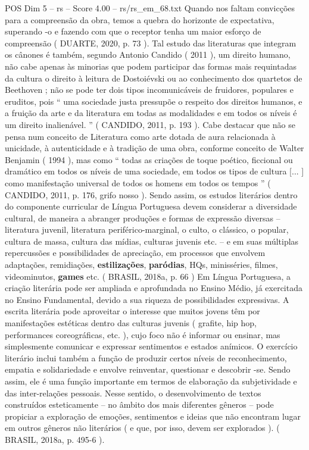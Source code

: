 \begin{textsample}{POS Dim 5 – rs – Score 4.00 – rs/rs\_em\_68.txt}
Quando nos faltam convicções para a compreensão da obra, temos a quebra do horizonte de expectativa, superando -o e fazendo com que o receptor tenha um maior esforço de compreensão ( DUARTE, 2020, p. 73 ).
Tal estudo das literaturas que integram os cânones é também, segundo Antonio Candido ( 2011 ), um direito humano, não cabe apenas às minorias que podem participar das formas mais requintadas da cultura o direito à leitura de Dostoiévski ou ao conhecimento dos quartetos de Beethoven ; não se pode ter dois tipos incomunicáveis de fruidores, populares e eruditos, pois “ uma sociedade justa pressupõe o respeito dos direitos humanos, e a fruição da arte e da literatura em todas as modalidades e em todos os níveis é um direito inalienável. ” ( CANDIDO, 2011, p. 193 ).
Cabe destacar que não se pensa num conceito de Literatura como arte dotada de aura relacionada à unicidade, à autenticidade e à tradição de uma obra, conforme conceito de Walter Benjamin ( 1994 ), mas como “ todas as criações de toque poético, ficcional ou dramático em todos os níveis de uma sociedade, em todos os tipos de cultura [... ] como manifestação universal de todos os homens em todos os tempos ” ( CANDIDO, 2011, p. 176, grifo nosso ).
Sendo assim, os estudos literários dentro do componente curricular de Língua Portuguesa devem considerar a diversidade cultural, de maneira a abranger produções e formas de expressão diversas – literatura juvenil, literatura periférico-marginal, o culto, o clássico, o popular, cultura de massa, cultura das mídias, culturas juvenis etc. – e em suas múltiplas repercussões e possibilidades de apreciação, em processos que envolvem adaptações, remidiações, \textbf{estilizações}, \textbf{paródias}, HQs, minisséries, filmes, videominutos, \textbf{games} etc. ( BRASIL, 2018a, p. 66 ) Em Língua Portuguesa, a criação literária pode ser ampliada e aprofundada no Ensino Médio, já exercitada no Ensino Fundamental, devido a sua riqueza de possibilidades expressivas.
A escrita literária pode aproveitar o interesse que muitos jovens têm por manifestações estéticas dentro das culturas juvenis ( grafite, hip hop, performances coreográficas, etc. ), cujo foco não é informar ou ensinar, mas simplesmente comunicar e expressar sentimentos e estados anímicos.
O exercício literário inclui também a função de produzir certos níveis de reconhecimento, empatia e solidariedade e envolve reinventar, questionar e descobrir -se.
Sendo assim, ele é uma função importante em termos de elaboração da subjetividade e das inter-relações pessoais.
Nesse sentido, o desenvolvimento de textos construídos esteticamente – no âmbito dos mais diferentes gêneros – pode propiciar a exploração de emoções, sentimentos e ideias que não encontram lugar em outros gêneros não literários ( e que, por isso, devem ser explorados ). ( BRASIL, 2018a, p. 495-6 ).

\end{textsample}
